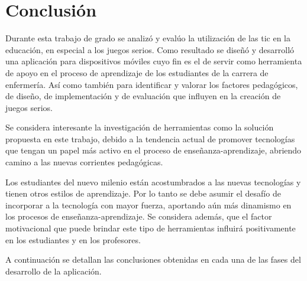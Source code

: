 \chapter{Conclusión}
\label{chap:conclusion}


Durante esta trabajo de grado se analizó y evalúo la utilización de las
\Gls{tic} en la educación, en especial a los juegos serios. Como resultado se
diseñó y desarrolló una aplicación para dispositivos móviles cuyo fin es el de
servir como herramienta de apoyo en el proceso de aprendizaje de los estudiantes
de la carrera de enfermería. Así como también para identificar y valorar
los factores pedagógicos, de diseño, de implementación y de evaluación que
influyen en la creación de juegos serios.

Se considera interesante la investigación de herramientas como la solución
propuesta en este trabajo, debido a la tendencia actual de promover tecnologías
que tengan un papel más activo en el proceso de enseñanza-aprendizaje, abriendo
camino a las nuevas corrientes pedagógicas. 

Los estudiantes del nuevo milenio están acostumbrados a las nuevas tecnologías y
tienen otros estilos de aprendizaje. Por lo tanto se debe asumir el desafío de
incorporar a la tecnología con mayor fuerza, aportando aún más dinamismo en los
procesos de enseñanza-aprendizaje. Se considera además, que el factor motivacional
que puede brindar este tipo de herramientas influirá positivamente en los
estudiantes y en los profesores.

A continuación se detallan las conclusiones obtenidas en cada una de las fases
del desarrollo de la aplicación.

%
%
%

%
%
%

